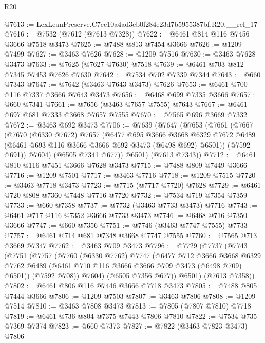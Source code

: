 \begin{lexlean}{R20}
\begin{coremodule}
@7613 := LexLeanPreserve.C7ec10a4ad3cb0f284e23d7b5955387bf.R20.__rel_17
@7616 := @7532 (@7612 (@7613 @7328))
@7622 := @6461 @814 @116 @7456 @3666 @7518 @3473
@7625 := @7488 @813 @7454 @3666
@7626 := @1209 @7499
@7627 := @3463 @7626
@7628 := @1209 @7516
@7630 := @3463 @7628 @3473
@7633 := @7625 (@7627 @7630) @7518
@7639 := @6461 @703 @812 @7345 @7453 @7626 @7630
@7642 := @7534 @702 @7339 @7344
@7643 := @660 @7343
@7647 := @7642 (@3463 @7643 @3473) @7626
@7653 := @6461 @700 @116 @7337 @3666 @7643 @3473
@7656 := @6468 @699 @7335 @3666
@7657 := @660 @7341
@7661 := @7656 (@3463 @7657 @7555) @7643
@7667 := @6461 @697 @681 @7333 @3668 @7657 @7555
@7670 := @7565 @696 @3669 @7332
@7672 := @3463 @692 @3473
@7706 := @7639
    (@7647
      (@7653
        (@7661
          (@7667
            (@7670
              (@6330 @7672)
              @7657
              (@6477
                @695
                @3666
                @3668
                @6329
                @7672
                @6489
                (@6461 @693 @116 @3666 @3666 @692 @3473 (@6498 @692) @6501))
              (@7592 @691))
            @7604)
          (@6505 @7341 @677))
        @6501)
      (@7613 @7343))
@7712 := @6461 @810 @116 @7451 @3666 @7628 @3473
@7715 := @7488 @809 @7449 @3666
@7716 := @1209 @7501
@7717 := @3463 @7716
@7718 := @1209 @7515
@7720 := @3463 @7718 @3473
@7723 := @7715 (@7717 @7720) @7628
@7729 := @6461 @720 @808 @7360 @7448 @7716 @7720
@7732 := @7534 @719 @7354 @7359
@7733 := @660 @7358
@7737 := @7732 (@3463 @7733 @3473) @7716
@7743 := @6461 @717 @116 @7352 @3666 @7733 @3473
@7746 := @6468 @716 @7350 @3666
@7747 := @660 @7356
@7751 := @7746 (@3463 @7747 @7555) @7733
@7757 := @6461 @714 @681 @7348 @3668 @7747 @7555
@7760 := @7565 @713 @3669 @7347
@7762 := @3463 @709 @3473
@7796 := @7729
    (@7737
      (@7743
        (@7751
          (@7757
            (@7760
              (@6330 @7762)
              @7747
              (@6477
                @712
                @3666
                @3668
                @6329
                @7762
                @6489
                (@6461 @710 @116 @3666 @3666 @709 @3473 (@6498 @709) @6501))
              (@7592 @708))
            @7604)
          (@6505 @7356 @677))
        @6501)
      (@7613 @7358))
@7802 := @6461 @806 @116 @7446 @3666 @7718 @3473
@7805 := @7488 @805 @7444 @3666
@7806 := @1209 @7503
@7807 := @3463 @7806
@7808 := @1209 @7514
@7810 := @3463 @7808 @3473
@7813 := @7805 (@7807 @7810) @7718
@7819 := @6461 @736 @804 @7375 @7443 @7806 @7810
@7822 := @7534 @735 @7369 @7374
@7823 := @660 @7373
@7827 := @7822 (@3463 @7823 @3473) @7806

\end{coremodule}
\end{lexlean}

